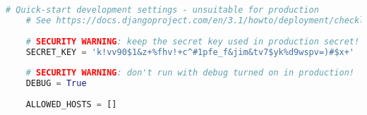 \begin{lstlisting}[language=Python,caption={Fragment of unchanged newly generated Django settings file},breaklines=true,label={lst:djangoSettings}]
    # Quick-start development settings - unsuitable for production
    # See https://docs.djangoproject.com/en/3.1/howto/deployment/checklist/
    
    # SECURITY WARNING: keep the secret key used in production secret!
    SECRET_KEY = 'k!vv90$1&z+%fhv!+c^#1pfe_f&jim&tv7$yk%d9wspv=)#$x+'
    
    # SECURITY WARNING: don't run with debug turned on in production!
    DEBUG = True
    
    ALLOWED_HOSTS = []
\end{lstlisting}
